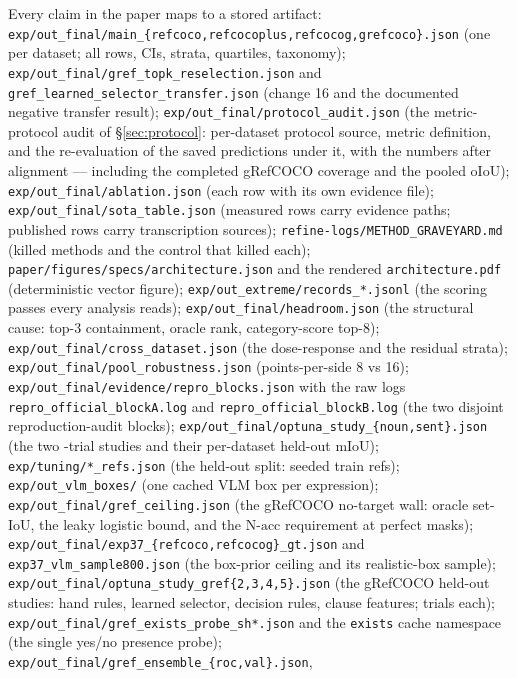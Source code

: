 Every claim in the paper maps to a stored artifact:
\texttt{exp/out\_final/main\_\{refcoco,refcocoplus,refcocog,grefcoco\}.json}
(one per dataset; all rows, CIs, strata, quartiles, taxonomy);
\texttt{exp/out\_final/gref\_topk\_reselection.json} and
\texttt{gref\_learned\_selector\_transfer.json} (change 16 and the documented
negative transfer result);
\texttt{exp/out\_final/protocol\_audit.json} (the metric-protocol audit of
\S\ref{sec:protocol}: per-dataset protocol source, metric definition, and the
re-evaluation of the saved predictions under it, with the numbers after
alignment --- including the completed gRefCOCO coverage and the pooled oIoU);
\texttt{exp/out\_final/ablation.json} (each row with its own evidence file);
\texttt{exp/out\_final/sota\_table.json} (measured rows carry evidence paths;
published rows carry transcription sources);
\texttt{refine-logs/METHOD\_GRAVEYARD.md} (killed methods and the control
that killed each);
\texttt{paper/figures/specs/architecture.json} and the rendered
\texttt{architecture.pdf} (deterministic vector figure);
\texttt{exp/out\_extreme/records\_*.jsonl} (the scoring passes every analysis
reads);
\texttt{exp/out\_final/headroom.json} (the structural cause: top-3
containment, oracle rank, category-score top-8);
\texttt{exp/out\_final/cross\_dataset.json} (the dose-response and the
residual strata);
\texttt{exp/out\_final/pool\_robustness.json} (points-per-side 8 vs 16);
\texttt{exp/out\_final/evidence/repro\_blocks.json} with the raw logs
\texttt{repro\_official\_blockA.log} and \texttt{repro\_official\_blockB.log}
(the two disjoint reproduction-audit blocks);
\texttt{exp/out\_final/optuna\_study\_\{noun,sent\}.json} (the two
\studyTrials{}-trial studies and their per-dataset held-out mIoU);
\texttt{exp/tuning/*\_refs.json} (the held-out split: seeded train refs);
\texttt{exp/out\_vlm\_boxes/} (one cached VLM box per expression);
\texttt{exp/out\_final/gref\_ceiling.json} (the gRefCOCO no-target wall:
oracle set-IoU, the leaky logistic bound, and the $\mathrm{N\text{-}acc}$
requirement at perfect masks);
\texttt{exp/out\_final/exp37\_\{refcoco,refcocog\}\_gt.json} and
\texttt{exp37\_vlm\_sample800.json} (the box-prior ceiling and its
realistic-box sample);
\texttt{exp/out\_final/optuna\_study\_gref\{2,3,4,5\}.json} (the gRefCOCO
held-out studies: hand rules, learned selector, decision rules, clause
features; \studyTrials{} trials each);
\texttt{exp/out\_final/gref\_exists\_probe\_sh*.json} and the
\texttt{exists} cache namespace (the single yes/no presence probe);
\texttt{exp/out\_final/gref\_ensemble\_\{roc,val\}.json},
